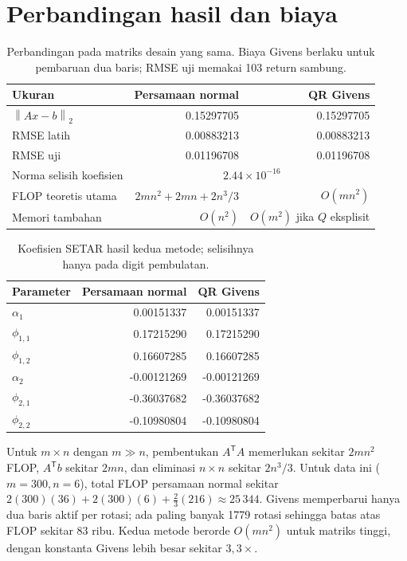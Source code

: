 \documentclass[11pt,a4paper]{article}
\newcommand{\norm}[1]{\left\lVert #1\right\rVert_2}
\begin{document}
\section{Perbandingan hasil dan biaya}
\begin{table}[H]
\centering
\caption{Perbandingan pada matriks desain yang sama. Biaya Givens berlaku untuk pembaruan dua baris; RMSE uji memakai 103 return sambung.}
\begin{tabular}{lrr}
\toprule
Ukuran & Persamaan normal & QR Givens\\
\midrule
$\norm{Ax-b}$ & 0.15297705 & 0.15297705\\
RMSE latih & 0.00883213 & 0.00883213\\
RMSE uji & 0.01196708 & 0.01196708\\
Norma selisih koefisien & \multicolumn{2}{c}{$2.44\times10^{-16}$}\\
FLOP teoretis utama & $2mn^2+2mn+2n^3/3$ & $O(mn^2)$\\
Memori tambahan & $O(n^2)$ & $O(m^2)$ jika $Q$ eksplisit\\
\bottomrule
\end{tabular}
\end{table}

\begin{table}[H]
\centering
\caption{Koefisien SETAR hasil kedua metode; selisihnya hanya pada digit pembulatan.}
\begin{tabular}{lrr}
\toprule
Parameter & Persamaan normal & QR Givens\\
\midrule
$\alpha_1$ & 0.00151337 & 0.00151337\\
$\phi_{1,1}$ & 0.17215290 & 0.17215290\\
$\phi_{1,2}$ & 0.16607285 & 0.16607285\\
$\alpha_2$ & -0.00121269 & -0.00121269\\
$\phi_{2,1}$ & -0.36037682 & -0.36037682\\
$\phi_{2,2}$ & -0.10980804 & -0.10980804\\
\bottomrule
\end{tabular}
\end{table}

Untuk $m\times n$ dengan $m\gg n$, pembentukan $A^\mathsf{T}A$ memerlukan sekitar $2mn^2$ FLOP, $A^\mathsf{T}b$ sekitar $2mn$, dan eliminasi $n\times n$ sekitar $2n^3/3$. Untuk data ini ($m=300,n=6$), total FLOP persamaan normal sekitar $2(300)(36)+2(300)(6)+\tfrac{2}{3}(216)\approx25\,344$. Givens memperbarui hanya dua baris aktif per rotasi; ada paling banyak 1779 rotasi sehingga batas atas FLOP sekitar 83 ribu. Kedua metode berorde $O(mn^2)$ untuk matriks tinggi, dengan konstanta Givens lebih besar sekitar $3{,}3\times$.
\end{document}
